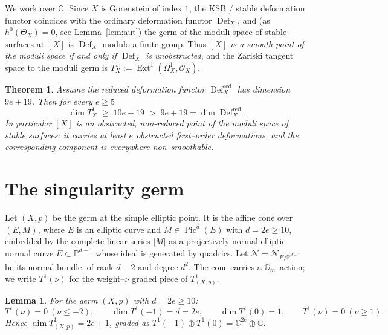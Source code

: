 \documentclass[11pt]{amsart}
\newtheorem{theorem}{Theorem}
\newtheorem{lemma}{Lemma}
\theoremstyle{definition}
\DeclareMathOperator{\Def}{Def}
\DeclareMathOperator{\Ext}{Ext}
\DeclareMathOperator{\Pic}{Pic}
\newcommand{\cO}{\mathcal{O}}
\newcommand{\cN}{\mathcal{N}}
\newcommand{\Om}{\Omega}
\newcommand{\PP}{\mathbb{P}}
\newcommand{\CC}{\mathbb{C}}
\newcommand{\Gm}{\mathbb{G}_m}
\begin{document}
We work over $\CC$. Since $X$ is Gorenstein of index $1$, the KSB / stable
deformation functor coincides with the ordinary deformation functor $\Def_X$,
and (as $h^0(\Theta_X)=0$, see Lemma~\ref{lem:aut}) the germ of the moduli space
of stable surfaces at $[X]$ is $\Def_X$ modulo a finite group. Thus
\emph{$[X]$ is a smooth point of the moduli space if and only if $\Def_X$ is
unobstructed}, and the Zariski tangent space to the moduli germ is
$T^1_X:=\Ext^1(\Om^1_X,\cO_X)$.

\begin{theorem}\label{main}
Assume the reduced deformation functor $\Def_X^{\mathrm{red}}$ has dimension
$9e+19$. Then for every $e\ge 5$
\[
\dim T^1_X\;\ge\;10e+19\;>\;9e+19=\dim \Def_X^{\mathrm{red}}.
\]
In particular $[X]$ is an obstructed, non-reduced point of the moduli space of
stable surfaces: it carries at least $e$ obstructed first--order deformations,
and the corresponding component is everywhere non--smoothable.
\end{theorem}

\section{The singularity germ}

Let $(X,p)$ be the germ at the simple elliptic point. It is the affine cone over
$(E,M)$, where $E$ is an elliptic curve and $M\in\Pic^{d}(E)$ with $d=2e\ge 10$,
embedded by the complete linear series $|M|$ as a projectively normal elliptic
normal curve $E\subset\PP^{d-1}$ whose ideal is generated by quadrics. Let
$\cN=\cN_{E/\PP^{d-1}}$ be its normal bundle, of rank $d-2$ and degree $d^2$.
The cone carries a $\Gm$--action; we write $T^1(\nu)$ for the weight--$\nu$ graded
piece of $T^1_{(X,p)}$.

\begin{lemma}\label{lem:germ}
For the germ $(X,p)$ with $d=2e\ge10$:
\[
T^1(\nu)=0\ (\nu\le -2),\qquad \dim T^1(-1)=d=2e,\qquad \dim T^1(0)=1,\qquad
T^1(\nu)=0\ (\nu\ge 1).
\]
Hence $\dim T^1_{(X,p)}=2e+1$, graded as $T^1(-1)\oplus T^1(0)=\CC^{2e}\oplus\CC$.
\end{lemma}
\end{document}
